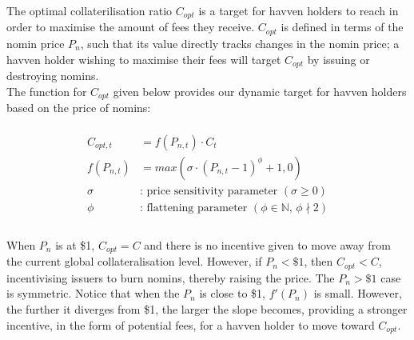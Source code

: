 \noindent The optimal collaterilisation ratio $C_{opt}$ is a target for havven
holders to reach in order to maximise the amount of fees they receive.
$C_{opt}$ is defined in terms of the nomin price $P_n$, such that its value directly tracks changes in the nomin price; a havven
holder wishing to maximise their fees will target $C_{opt}$ by issuing or destroying nomins. \\

\noindent The function for $C_{opt}$ given below provides our dynamic target
for havven holders based on the price of nomins:

\begin{gather} \label{eq:optcollateralisation}
\begin{align}
\begin{split}
C_{opt,t} &= f(P_{n,t}) \cdot C_t  \\ 
f(P_{n,t}) &= max(\sigma \cdot (P_{n,t} - 1)^{\phi} + 1, 0) \\
\sigma & \text{: price sensitivity parameter } (\sigma \geq 0)\\
\phi   & \text{: flattening parameter } (\phi \in \mathbb{N} \text{, } \phi \nmid 2) \\
\end{split}
\end{align}
\end{gather}


\begin{center}
\end{center}

\noindent When $P_n$ is at \$1, $C_{opt} = C$ and there is no incentive given to move away from the current global collateralisation level. However, if $P_n < \$1$, then $C_{opt} < C$, incentivising issuers to burn nomins, thereby raising the price. The $P_n > \$1$ case is symmetric. Notice that when the $P_n$ is close to \$1, $ f'(P_n) $ is small. However, the further it diverges from \$1, the larger the slope becomes, providing a stronger incentive, in the form of potential fees, for a havven holder to move toward $C_{opt}$. \\

